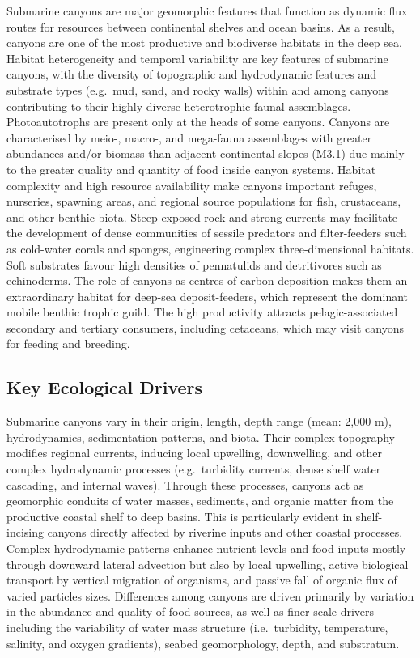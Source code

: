 \documentclass[
  letterpaper,
  DIV=11,
  numbers=noendperiod]{scrartcl}
\begin{document}
Submarine canyons are major geomorphic features that function as dynamic
flux routes for resources between continental shelves and ocean basins.
As a result, canyons are one of the most productive and biodiverse
habitats in the deep sea. Habitat heterogeneity and temporal variability
are key features of submarine canyons, with the diversity of topographic
and hydrodynamic features and substrate types (e.g.~mud, sand, and rocky
walls) within and among canyons contributing to their highly diverse
heterotrophic faunal assemblages. Photoautotrophs are present only at
the heads of some canyons. Canyons are characterised by meio-, macro-,
and mega-fauna assemblages with greater abundances and/or biomass than
adjacent continental slopes (M3.1) due mainly to the greater quality and
quantity of food inside canyon systems. Habitat complexity and high
resource availability make canyons important refuges, nurseries,
spawning areas, and regional source populations for fish, crustaceans,
and other benthic biota. Steep exposed rock and strong currents may
facilitate the development of dense communities of sessile predators and
filter-feeders such as cold-water corals and sponges, engineering
complex three-dimensional habitats. Soft substrates favour high
densities of pennatulids and detritivores such as echinoderms. The role
of canyons as centres of carbon deposition makes them an extraordinary
habitat for deep-sea deposit-feeders, which represent the dominant
mobile benthic trophic guild. The high productivity attracts
pelagic-associated secondary and tertiary consumers, including
cetaceans, which may visit canyons for feeding and breeding.

\subsection{Key Ecological Drivers}\label{key-ecological-drivers-41}

Submarine canyons vary in their origin, length, depth range (mean: 2,000
m), hydrodynamics, sedimentation patterns, and biota. Their complex
topography modifies regional currents, inducing local upwelling,
downwelling, and other complex hydrodynamic processes (e.g.~turbidity
currents, dense shelf water cascading, and internal waves). Through
these processes, canyons act as geomorphic conduits of water masses,
sediments, and organic matter from the productive coastal shelf to deep
basins. This is particularly evident in shelf-incising canyons directly
affected by riverine inputs and other coastal processes. Complex
hydrodynamic patterns enhance nutrient levels and food inputs mostly
through downward lateral advection but also by local upwelling, active
biological transport by vertical migration of organisms, and passive
fall of organic flux of varied particles sizes. Differences among
canyons are driven primarily by variation in the abundance and quality
of food sources, as well as finer-scale drivers including the
variability of water mass structure (i.e.~turbidity, temperature,
salinity, and oxygen gradients), seabed geomorphology, depth, and
substratum.
\end{document}
